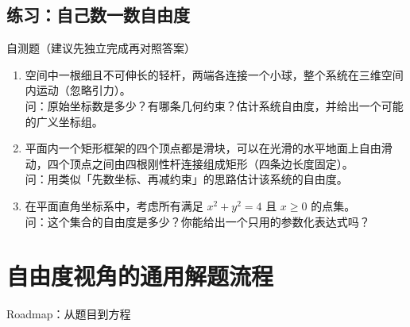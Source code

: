 \documentclass[a4paper,11pt]{ctexart}
\begin{document}
\subsection{练习：自己数一数自由度}

\begin{summarybox}{自测题（建议先独立完成再对照答案）}
  \begin{enumerate}
    \item 空间中一根细且不可伸长的轻杆，两端各连接一个小球，整个系统在三维空间内运动（忽略引力）。\\
          问：原始坐标数是多少？有哪条几何约束？估计系统自由度，并给出一个可能的广义坐标组。
    \item 平面内一个矩形框架的四个顶点都是滑块，可以在光滑的水平地面上自由滑动，四个顶点之间由四根刚性杆连接组成矩形（四条边长度固定）。\\
          问：用类似「先数坐标、再减约束」的思路估计该系统的自由度。
    \item 在平面直角坐标系中，考虑所有满足 $x^2 + y^2 = 4$ 且 $x \ge 0$ 的点集。\\
          问：这个集合的自由度是多少？你能给出一个只用的参数化表达式吗？
  \end{enumerate}
\end{summarybox}

\clearpage
\section{自由度视角的通用解题流程}

\begin{summarybox}{Roadmap：从题目到方程}
  \begin{roadmap}
  \end{roadmap}
\end{summarybox}
\end{document}
